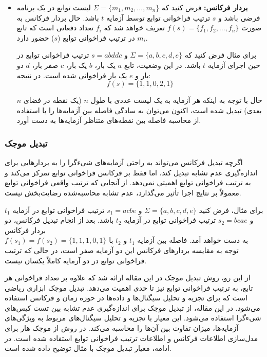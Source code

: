 \begin{itemize}
	\item \textbf{بردار فرکانس:}
	فرض کنید که \(\Sigma = \{m_1, m_2, \dots, m_n\}\) لیست توابع در یک برنامه فرضی باشد و \(s\) ترتیب فراخوانی توابع توسط آزمایه \(t\) باشد. حال بردار فرکانس به صورت 
	\(f(s) = \{f_1, f_2, \dots, f_n\}\)
	 تعریف خواهد شد که \(f_i\) تعداد دفعاتی است که تابع \(m_i\) در ترتیب فراخوانی توابع (\(s\)) حضور دارد.
	
	برای مثال فرض کنید که \(\Sigma = \{a, b, c, d, e\}\) و \(s = abddc\) ترتیب فراخوانی توابع در حین اجرای آزمایه \(t\) باشد. در این وضعیت، تابع \(a\) یک بار، \(b\) یک بار، \(c\) صفر بار، \(d\) دو بار و \(e\) یک بار فراخوانی شده است. در نتیجه:
	\[
	f(s) = \{1, 1, 0, 2, 1\}
	\]
	
	حال با توجه به اینکه هر آزمایه به یک لیست عددی با طول \(n\) (یک نقطه در فضای \(n\) بعدی) تبدیل شده است، اکنون می‌توان به سادگی فاصله بین آزمایه‌ها را با استفاده از محاسبه فاصله بین نقطه‌های متناظر آزمایه‌ها به دست آورد.
	
\end{itemize}

\subsubsection{تبدیل موجک}
اگرچه تبدیل فرکانس می‌تواند به راحتی آزمایه‌های شیء‌گرا را به بردارهایی برای اندازه‌گیری عدم تشابه تبدیل کند، اما فقط بر فرکانس فراخوانی توابع تمرکز می‌کند و به ترتیب فراخوانی توابع اهمیتی نمی‌دهد. از آنجایی که ترتیب واقعی فراخوانی توابع معمولاً بر نتایج اجرا تأثیر می‌گذارد، عدم تشابه محاسبه‌شده رضایت‌بخش نیست.

برای مثال، فرض کنید \(\Sigma = \{a, b, c, d, e\}\) و \(s_1 = acbe\) ترتیب فراخوانی توابع در آزمایه \(t_1\) و \(s_2 = bcae\) ترتیب فراخوانی توابع در آزمایه \(t_2\) باشد. بعد از انجام تبدیل فرکانس، دو بردار فرکانس\\ \(f(s_1) = f(s_2) = \{1, 1, 1, 0, 1\}\) به دست خواهد آمد. فاصله بین آزمایه \(t_1\) و \(t_2\) با توجه به مقایسه بردارهای فرکانس این دو آزمایه صفر است، در حالی که ترتیب فراخوانی توابع در دو آزمایه کاملاً یکسان نیست.

از این رو، روش تبدیل موجک در این مقاله ارائه شد که علاوه بر تعداد فراخوانی هر تابع، به ترتیب فراخوانی توابع نیز تا حدی اهمیت می‌دهد. تبدیل موجک ابزاری ریاضی است که برای تجزیه و تحلیل سیگنال‌ها و داده‌ها در حوزه زمان و فرکانس استفاده می‌شود. در این مقاله، از تبدیل موجک برای اندازه‌گیری عدم تشابه بین تست‌ کیس‌های شیءگرا استفاده می‌شود. این معیار با تجزیه و تحلیل سیگنال‌های مربوط به ویژگی‌های آزمایه‌ها، میزان تفاوت بین آن‌ها را محاسبه می‌کند. در روش
 از موجک هار  برای مدل‌سازی اطلاعات فرکانس و اطلاعات ترتیب فراخوانی توابع استفاده شده است. در ادامه، معیار تبدیل موجک با مثال توضیح داده شده است.


